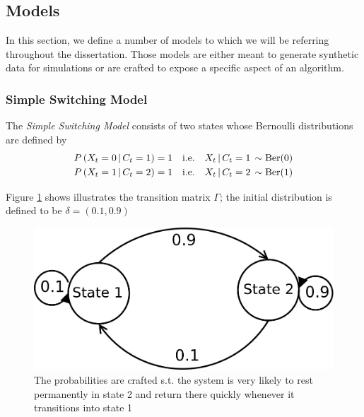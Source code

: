\subsection{Models}
In this section, we define a number of models to which we will be referring throughout the dissertation. Those models are either meant to generate synthetic data for simulations or are crafted to expose a specific aspect of an algorithm.

\subsubsection{Simple Switching Model}
The \textit{Simple Switching Model} consists of two states whose Bernoulli distributions are defined by
\begin{align*}
	P\left(X_t = 0 \, | \, C_t = 1\right) &= 1 \quad
	 \text{i.e.} \quad X_t \, | \, C_t = 1 \, \sim \text{Ber}(0) \\
	P\left(X_t = 1 \, | \, C_t = 2\right) &= 1 \quad
	\text{i.e.} \quad X_t \, | \, C_t = 2 \, \sim \text{Ber}(1)
\end{align*}

Figure \ref{ssm_transitions} shows illustrates the transition matrix $\Gamma$; the initial distribution is defined to be $\delta = (0.1, 0.9)$
\begin{figure}
	\includegraphics[width=\linewidth]{../forward_algorithm/lib/models/simpleSwitchingModel/ssm_transitions.png}
	\caption{The probabilities are crafted s.t. the system is very likely to rest permanently in state 2 and return there quickly whenever it transitions into state 1}
	\label{ssm_transitions}
\end{figure}